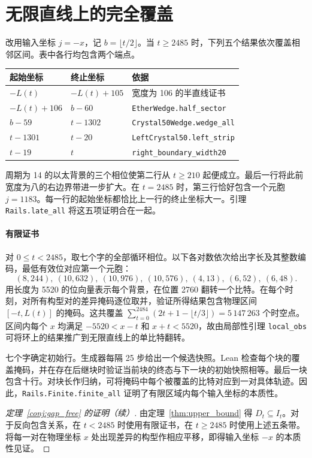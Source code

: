 \documentclass[11pt, a4paper]{article}
\begin{document}
\section{无限直线上的完全覆盖}
改用输入坐标 $j=-x$，记 $b=\lfloor t/2\rfloor$。当 $t\ge2485$ 时，下列五个结果依次覆盖相邻区间。表中各行均包含两个端点。
\begin{center}
\begin{tabular}{lll}
\toprule
起始坐标 & 终止坐标 & 依据 \\
\midrule
$-L(t)$ & $-L(t)+105$ & 宽度为 106 的半直线证书 \\
$-L(t)+106$ & $b-60$ & \texttt{EtherWedge.half\_sector} \\
$b-59$ & $t-1302$ & \texttt{Crystal50Wedge.wedge\_all} \\
$t-1301$ & $t-20$ & \texttt{LeftCrystal50.left\_strip} \\
$t-19$ & $t$ & \texttt{right\_boundary\_width20} \\
\bottomrule
\end{tabular}
\end{center}
周期为 14 的以太背景的三个相位使第二行从 $t\ge210$ 起便成立。最后一行将此前宽度为八的右边界带进一步扩大。在 $t=2485$ 时，第三行恰好包含一个元胞 $j=1183$。每一行的起始坐标都恰比上一行的终止坐标大一。引理 \texttt{Rails.late\_all} 将这五项证明合在一起。

\paragraph{有限证书}
对 $0\le t<2485$，取七个字的全部循环相位。以下各对数依次给出字长及其整数编码，最低有效位对应第一个元胞：
\[
(8,244),\ (10,632),\ (10,976),\ (10,576),\ (4,13),\ (6,52),\ (6,48).
\]
用长度为 5520 的位向量表示每个背景，在位置 2760 翻转一个比特。在每个时刻，对所有构型对的差异掩码逐位取并，验证所得结果包含物理区间 $[-t,L(t)]$ 的掩码。这共覆盖 $\sum_{t=0}^{2484}(2t+1-\lfloor t/3\rfloor)=5\,147\,263$ 个时空点。区间内每个 $x$ 均满足 $-5520<x-t$ 和 $x+t<5520$，故由局部性引理 \texttt{local\_obs} 可将环上的结果推广到无限直线上的单比特翻转。

七个字确定初始行。生成器每隔 25 步给出一个候选快照。Lean 检查每个块的覆盖掩码，并在存在后继块时验证当前块的终态与下一块的初始快照相等。最后一块包含十行。对块长作归纳，可将掩码中每个被覆盖的比特对应到一对具体轨迹。因此，\texttt{Rails.Finite.finite\_all} 证明了有限区域内每个输入坐标的本质性。

\begin{proof}[定理~\ref{conj:gap_free} 的证明（续）]
由定理~\ref{thm:upper_bound} 得 $D_t\subseteq I_t$。对于反向包含关系，在 $t<2485$ 时使用有限证书，在 $t\ge2485$ 时使用上述五条带。将每一对在物理坐标 $x$ 处出现差异的构型作相应平移，即得输入坐标 $-x$ 的本质性见证。
\end{proof}
\end{document}
